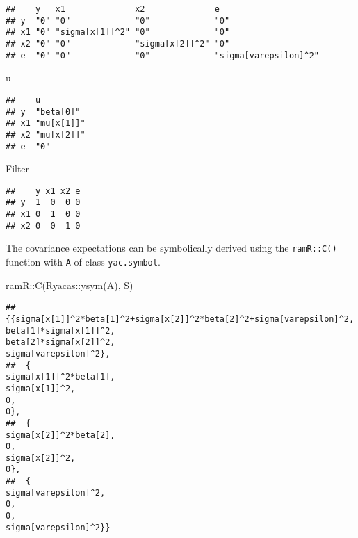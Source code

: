 \documentclass[
]{book}
\newenvironment{Shaded}{\begin{snugshade}}{\end{snugshade}}
\newcommand{\FunctionTok}[1]{\textcolor[rgb]{0.00,0.00,0.00}{#1}}
\newcommand{\NormalTok}[1]{#1}
\newcommand{\SpecialCharTok}[1]{\textcolor[rgb]{0.00,0.00,0.00}{#1}}
\theoremstyle{definition}
\theoremstyle{definition}
\theoremstyle{definition}
\theoremstyle{remark}
\begin{document}
\begin{verbatim}
##    y   x1              x2              e                    
## y  "0" "0"             "0"             "0"                  
## x1 "0" "sigma[x[1]]^2" "0"             "0"                  
## x2 "0" "0"             "sigma[x[2]]^2" "0"                  
## e  "0" "0"             "0"             "sigma[varepsilon]^2"
\end{verbatim}

\begin{Shaded}
\begin{Highlighting}[]
\NormalTok{u}
\end{Highlighting}
\end{Shaded}

\begin{verbatim}
##    u         
## y  "beta[0]" 
## x1 "mu[x[1]]"
## x2 "mu[x[2]]"
## e  "0"
\end{verbatim}

\begin{Shaded}
\begin{Highlighting}[]
\NormalTok{Filter}
\end{Highlighting}
\end{Shaded}

\begin{verbatim}
##    y x1 x2 e
## y  1  0  0 0
## x1 0  1  0 0
## x2 0  0  1 0
\end{verbatim}

The covariance expectations
can be symbolically derived using the \texttt{ramR::C()} function
with \texttt{A} of class \texttt{yac.symbol}.

\begin{Shaded}
\begin{Highlighting}[]
\NormalTok{ramR}\SpecialCharTok{::}\FunctionTok{C}\NormalTok{(Ryacas}\SpecialCharTok{::}\FunctionTok{ysym}\NormalTok{(A), S)}
\end{Highlighting}
\end{Shaded}

\begin{verbatim}
## {{sigma[x[1]]^2*beta[1]^2+sigma[x[2]]^2*beta[2]^2+sigma[varepsilon]^2,                                               beta[1]*sigma[x[1]]^2,                                               beta[2]*sigma[x[2]]^2,                                                 sigma[varepsilon]^2},
##  {                                              sigma[x[1]]^2*beta[1],                                                       sigma[x[1]]^2,                                                                   0,                                                                   0},
##  {                                              sigma[x[2]]^2*beta[2],                                                                   0,                                                       sigma[x[2]]^2,                                                                   0},
##  {                                                sigma[varepsilon]^2,                                                                   0,                                                                   0,                                                 sigma[varepsilon]^2}}
\end{verbatim}
\end{document}
